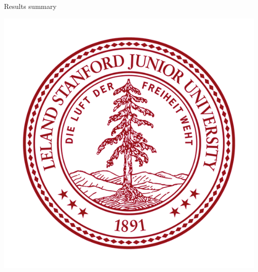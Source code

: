\documentclass[final]{beamer}
\newlength{\onecolwid}
\begin{document}
\begin{frame}[t]
\begin{columns}[t]
\begin{column}{\onecolwid}
\begin{block}{Results summary}
\begin{center}
    \includegraphics[scale=0.5]{Stanford_logo}
\end{center}
\end{block}









\end{column}
\end{columns}
\end{frame}
\end{document}
